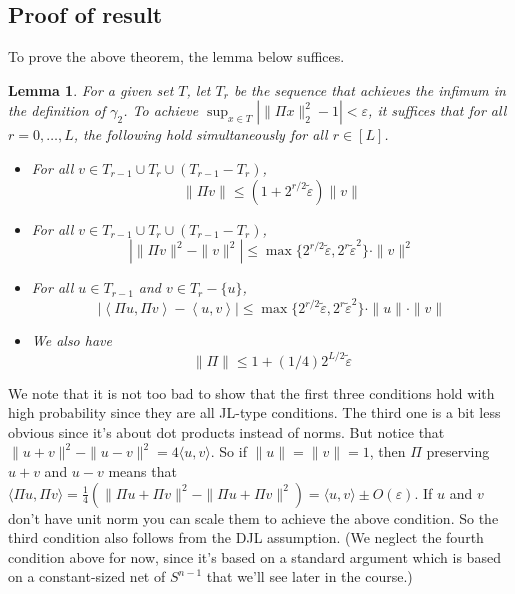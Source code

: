 \documentclass[11pt]{article}
\newtheorem{lemma}{Lemma}
\newcommand{\inprod}[1]{\left\langle #1 \right\rangle}
\newcommand{\teps}{\tilde \varepsilon}
\newcommand{\ep}{\varepsilon}
\newcommand{\EquationName}[1]{\label{eq:#1}}
\begin{document}
\subsection{Proof of result}
To prove the above theorem, the lemma below suffices.
\begin{lemma} \label{lem:conditions}
For a given set $T$, let $T_r$ be the sequence that achieves the infimum in the definition of $\gamma_2$. To achieve $\sup_{x \in T} \left| \|\Pi x\|_2^2 - 1\right| < \ep$, it suffices that for all $r = 0, \ldots, L$, the following hold simultaneously for all $r\in [L]$.
\begin{itemize}
\item For all $v \in T_{r-1} \cup T_r \cup (T_{r-1} - T_r)$,
\begin{equation}
\|\Pi v\| \le (1 + 2^{r/2}\teps)\|v\| \EquationName{ineq1}
\end{equation}
\item For all $v \in T_{r-1} \cup T_r \cup (T_{r-1} - T_r)$,
\begin{equation}
|\|\Pi v\|^2 - \|v\|^2| \le \max\{2^{r/2}\teps, 2^r \teps^2\}\cdot \|v\|^2 \EquationName{ineq2}
\end{equation}
\item For all $u\in T_{r-1}$ and $v\in T_r - \{u\}$,
\begin{equation}
|\inprod{\Pi u, \Pi v} - \inprod{u, v}| \le \max\{2^{r/2}\teps, 2^r \teps^2\} \cdot \|u\|\cdot \|v\|
\EquationName{ineq3}
\end{equation}
\item We also have 
\begin{equation}
\|\Pi\| \le 1 + (1/4)2^{L/2}\teps
\EquationName{ineq4}
\end{equation}
\end{itemize}
\end{lemma}
We note that it is not too bad to show that the first three conditions hold with high probability since they are all JL-type conditions. The third one is a bit less obvious since it's about dot products instead of norms. But notice that $\| u + v\|^2 - \|u - v\|^2 = 4 \langle u, v\rangle$. So if $\|u\| = \|v\| = 1$, then $\Pi$ preserving $u + v$ and $u - v$ means that $ \langle \Pi u, \Pi v \rangle = \frac{1}{4} ( \| \Pi u + \Pi v\|^2 - \| \Pi u + \Pi v\|^2 ) = \langle u, v \rangle \pm O(\ep)$. If $u$ and $v$ don't have unit norm you can scale them to achieve the above condition. So the third condition also follows from the DJL assumption. (We neglect the fourth condition above for now, since it's based on a standard argument which is based on a constant-sized net of $S^{n-1}$ that we'll see later in the course.)
\end{document}
